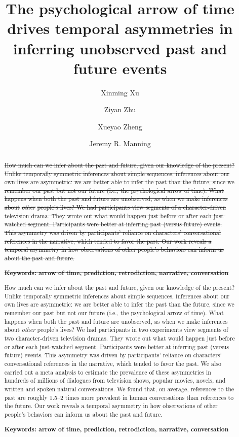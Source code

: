 \documentclass[10pt]{article}
\title{\Large The psychological arrow of time drives temporal asymmetries in inferring unobserved past and future events}
\author[1]{Xinming Xu}
\author[2]{Ziyan Zhu}
\author[3]{Xueyao Zheng} %
\author[1, $\star$]{Jeremy R. Manning}
\affil[1]{Dartmouth College, Hanover, NH, USA}
\affil[2]{Peking University, Beijing, China}
\affil[3]{Beijing Normal University, Beijing, China} %
\affil[$\star$]{Address correspondence to jeremy.r.manning@dartmouth.edu}
\providecommand{\DIFdeltex}[1]{{\protect\color{red}\sout{#1}}}                      %
\providecommand{\DIFaddbegin}{} %
\providecommand{\DIFaddend}{} %
\providecommand{\DIFdelbegin}{} %
\providecommand{\DIFdelend}{} %
\providecommand{\DIFdel}[1]{\texorpdfstring{\DIFdeltex{#1}}{}} %
\newcommand{\DIFscaledelfig}{0.5}
\newlength{\DIFdelgraphicswidth} %
\newlength{\DIFdelgraphicsheight} %
\newcommand{\DIFaddincludegraphics}[2][]{{\color{blue}\fbox{\DIFOincludegraphics[#1]{#2}}}} %
\newcommand{\DIFdelincludegraphics}[2][]{%
\sbox{\DIFdelgraphicsbox}{\DIFOincludegraphics[#1]{#2}}%
\settoboxwidth{\DIFdelgraphicswidth}{\DIFdelgraphicsbox} %
\settoboxtotalheight{\DIFdelgraphicsheight}{\DIFdelgraphicsbox} %
\scalebox{\DIFscaledelfig}{%
\parbox[b]{\DIFdelgraphicswidth}{\usebox{\DIFdelgraphicsbox}\\[-\baselineskip] \rule{\DIFdelgraphicswidth}{0em}}\llap{\resizebox{\DIFdelgraphicswidth}{\DIFdelgraphicsheight}{%
\setlength{\unitlength}{\DIFdelgraphicswidth}%
\begin{picture}(1,1)%
\thicklines\linethickness{2pt} %
{\color[rgb]{1,0,0}\put(0,0){\framebox(1,1){}}}%
{\color[rgb]{1,0,0}\put(0,0){\line( 1,1){1}}}%
{\color[rgb]{1,0,0}\put(0,1){\line(1,-1){1}}}%
\end{picture}%
}\hspace*{3pt}}} %
} %
\DeclareRobustCommand{\DIFaddbegin}{\DIFOaddbegin \let\includegraphics\DIFaddincludegraphics} %
\DeclareRobustCommand{\DIFaddend}{\DIFOaddend \let\includegraphics\DIFOincludegraphics} %
\DeclareRobustCommand{\DIFdelbegin}{\DIFOdelbegin \let\includegraphics\DIFdelincludegraphics} %
\DeclareRobustCommand{\DIFdelend}{\DIFOaddend \let\includegraphics\DIFOincludegraphics} %
\begin{document}
\maketitle

\begin{abstract} {\DIFdelbegin \DIFdel{How much can we infer about the past and future, given our knowledge of the present?  Unlike temporally symmetric inferences about simple sequences, inferences about our own lives are asymmetric: we are better able to infer the past than the future, since we remember our past but not our future (i.e., the psychological arrow of time).  What happens when both the past and future are unobserved, as when we make inferences about }\textit{\DIFdel{other}} %
\DIFdel{people's lives?  We had participants view segments of a character-driven television drama.  They wrote out what would happen just before or after each just-watched segment.  Participants were better at inferring past (versus future) events.  This asymmetry was driven by participants’ reliance on characters’ conversational references in the narrative, which tended to favor the past.  Our work reveals a temporal asymmetry in how observations of other people’s behaviors can inform us about the past and future.
}%

\textbf{\DIFdel{Keywords: arrow of time, prediction, retrodiction, narrative, conversation}}%
\DIFdelend \DIFaddbegin \footnotesize{ How much can we infer about the past and
future, given our knowledge of the present? Unlike temporally symmetric
inferences about simple sequences, inferences about our own lives are
asymmetric: we are better able to infer the past than the future, since we
remember our past but not our future (i.e., the psychological arrow of time).
What happens when both the past and future are unobserved, as when we make
inferences about \textit{other} people's lives? We had participants in two
experiments view segments of two character-driven television dramas. They wrote
out what would happen just before or after each just-watched segment.
Participants were better at inferring past (versus future) events. This
asymmetry was driven by participants’ reliance on characters’ conversational
references in the narrative, which tended to favor the past. We also carried
out a meta analysis to estimate the prevalence of these asymmetries in hundreds
of millions of dialogues from television shows, popular movies, novels, and
written and spoken natural conversations. We found that, on average, references
to the past are roughly 1.5--2 times more prevalent in human conversations than
references to the future. Our work reveals a temporal asymmetry in how
observations of other people’s behaviors can inform us about the past and
future.

\textbf{Keywords: arrow of time, prediction, retrodiction, narrative, conversation}}\DIFaddend }

\end{abstract}
\end{document}
